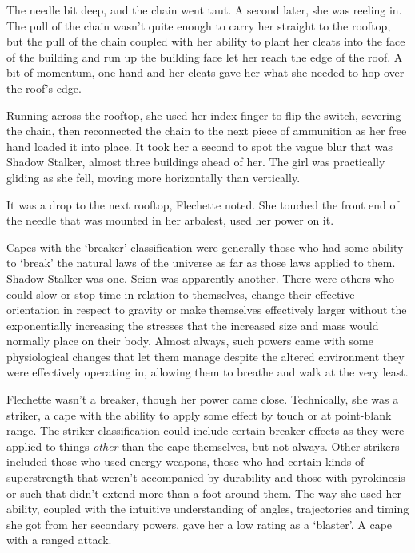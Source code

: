 The needle bit deep, and the chain went taut.  A second later, she was reeling in.  The pull of the chain wasn't quite enough to carry her straight to the rooftop, but the pull of the chain coupled with her ability to plant her cleats into the face of the building and run up the building face let her reach the edge of the roof.  A bit of momentum, one hand and her cleats gave her what she needed to hop over the roof's edge.



Running across the rooftop, she used her index finger to flip the switch, severing the chain, then reconnected the chain to the next piece of ammunition as her free hand loaded it into place.  It took her a second to spot the vague blur that was Shadow Stalker, almost three buildings ahead of her.  The girl was practically gliding as she fell, moving more horizontally than vertically.



It was a drop to the next rooftop, Flechette noted.  She touched the front end of the needle that was mounted in her arbalest, used her power on it.



Capes with the `breaker' classification were generally those who had some ability to `break' the natural laws of the universe as far as those laws applied to them.  Shadow Stalker was one.  Scion was apparently another.  There were others who could slow or stop time in relation to themselves, change their effective orientation in respect to gravity or make themselves effectively larger without the exponentially increasing the stresses that the increased size and mass would normally place on their body.  Almost always, such powers came with some physiological changes that let them manage despite the altered environment they were effectively operating in, allowing them to breathe and walk at the very least.



Flechette wasn't a breaker, though her power came close.  Technically, she was a striker, a cape with the ability to apply some effect by touch or at point-blank range.  The striker classification could include certain breaker effects as they were applied to things \emph{other} than the cape themselves, but not always.  Other strikers included those who used energy weapons, those who had certain kinds of superstrength that weren't accompanied by durability and those with pyrokinesis or such that didn't extend more than a foot around them.  The way she used her ability, coupled with the intuitive understanding of angles, trajectories and timing she got from her secondary powers, gave her a low rating as a `blaster'.  A cape with a ranged attack.



